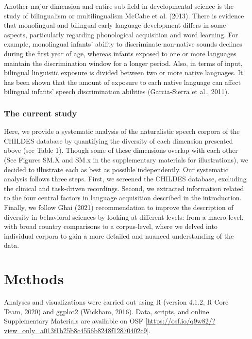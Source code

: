 \documentclass[
  man,floatsintext]{apa6}
\begin{document}
Another major dimension and entire sub-field in developmental science is the study of bilingualism or multilingualism McCabe et al. (2013). There is evidence that monolingual and bilingual early language development differs in some aspects, particularly regarding phonological acquisition and word learning. For example, monolingual infants' ability to discriminate non-native sounds declines during the first year of age, whereas infants exposed to one or more languages maintain the discrimination window for a longer period. Also, in terms of input, bilingual linguistic exposure is divided between two or more native languages. It has been shown that the amount of exposure to each native language can affect bilingual infants' speech discrimination abilities (Garcia-Sierra et al., 2011).

\hypertarget{the-current-study}{%
\subsubsection{The current study}\label{the-current-study}}

Here, we provide a systematic analysis of the naturalistic speech corpora of the CHILDES database by quantifying the diversity of each dimension presented above (see Table 1). Though some of these dimensions overlap with each other (See Figures SM.X and SM.x in the supplementary materials for illustrations), we decided to illustrate each as best as possible independently.
Our systematic analysis follows three steps. First, we screened the CHILDES database, excluding the clinical and task-driven recordings. Second, we extracted information related to the four central factors in language acquisition described in the introduction. Finally, we follow Ghai (2021) recommendation to improve the description of diversity in behavioral sciences by looking at different levels: from a macro-level, with broad country comparisons to a corpus-level, where we delved into individual corpora to gain a more detailed and nuanced understanding of the data.

\hypertarget{methods}{%
\section{Methods}\label{methods}}

Analyses and visualizations were carried out using R (version 4.1.2, R Core Team, 2020) and ggplot2 (Wickham, 2016). Data, scripts, and online Supplementary Materials are available on OSF {[}\url{https://osf.io/q9w82/?view_only=a013f1b25b8c4556b8248f12870402c9}{]}.
\end{document}
